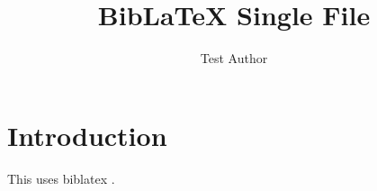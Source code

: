 \documentclass{article}
\begin{document}
\title{BibLaTeX Single File}
\author{Test Author}
\maketitle

\section{Introduction}

This uses biblatex \cite{kitchin-2015-examp}.

\printbibliography
\end{document}
